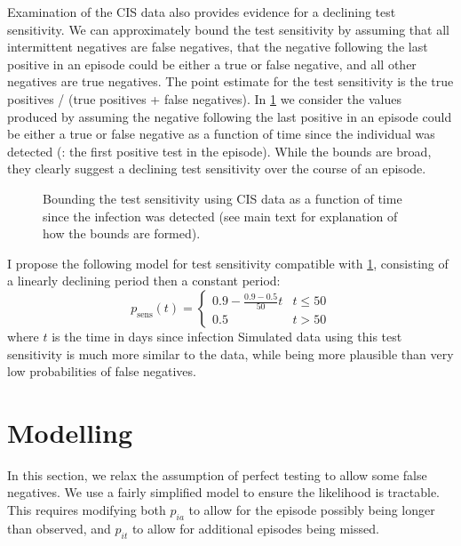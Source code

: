 \documentclass[thesis.tex]{subfiles}
\begin{document}
Examination of the CIS data also provides evidence for a declining test sensitivity.
We can approximately bound the test sensitivity by assuming that all intermittent negatives are false negatives, that the negative following the last positive in an episode could be either a true or false negative, and all other negatives are true negatives.
The point estimate for the test sensitivity is the true positives / (true positives + false negatives).
In \cref{imperf-test:fig:bounding-cis-sensitivity} we consider the values produced by assuming the negative following the last positive in an episode could be either a true or false negative as a function of time since the individual was detected (\ie: the first positive test in the episode).
While the bounds are broad, they clearly suggest a declining test sensitivity over the course of an episode.
\begin{figure}
  \caption[Bounding test sensitivity using CIS data]{Bounding the test sensitivity using CIS data as a function of time since the infection was detected (see main text for explanation of how the bounds are formed).\label{imperf-test:fig:bounding-cis-sensitivity}}
\end{figure}

I propose the following model for test sensitivity compatible with \cref{imperf-test:fig:bounding-cis-sensitivity}, consisting of a linearly declining period then a constant period:
\begin{equation}
  p_\text{sens}(t) = \begin{cases}
    0.9 - \frac{0.9-0.5}{50}t &t \leq 50 \\
    0.5 &t > 50
  \end{cases}
\end{equation}
where $t$ is the time in days since infection
Simulated data using this test sensitivity is much more similar to the data, while being more plausible than very low probabilities of false negatives.


\section{Modelling} \label{imperf-test:sec:modelling}

In this section, we relax the assumption of perfect testing to allow
some false negatives. We use a fairly simplified model to ensure the
likelihood is tractable. This requires modifying both $p_{ia}$ to
allow for the episode possibly being longer than observed, and
$p_{it}$ to allow for additional episodes being missed.
\end{document}
